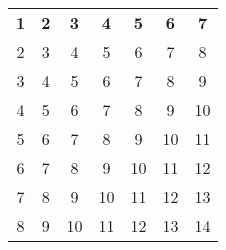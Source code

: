 \begin{tabular}{c|c|c|c|c|c|c|}
\textbf{1} & \textbf{2} & \textbf{3} & \textbf{4} & \textbf{5} & \textbf{6} & \textbf{7}\\
2 & 3 & 4 & 5 & 6 & 7 & 8\\
3 & 4 & 5 & 6 & 7 & 8 & 9\\
4 & 5 & 6 & 7 & 8 & 9 & 10\\
5 & 6 & 7 & 8 & 9 & 10 & 11\\
6 & 7 & 8 & 9 & 10 & 11 & 12\\
7 & 8 & 9 & 10 & 11 & 12 & 13\\
8 & 9 & 10 & 11 & 12 & 13 & 14
\end{tabular}